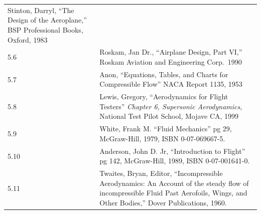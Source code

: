 \documentclass[
]{book}
\begin{document}
\begin{longtable}[]{@{}ll@{}}
\begin{minipage}[t]{0.88\columnwidth}
Stinton, Darryl, ``The Design of the Aeroplane,'' BSP Professional Books, Oxford, 1983\strut
\end{minipage}\tabularnewline
\begin{minipage}[t]{0.06\columnwidth}\raggedright
5.6\strut
\end{minipage} & \begin{minipage}[t]{0.88\columnwidth}\raggedright
Roskam, Jan Dr., ``Airplane Design, Part VI,'' Roskam Aviation and Engineering Corp.~1990\strut
\end{minipage}\tabularnewline
\begin{minipage}[t]{0.06\columnwidth}\raggedright
5.7\strut
\end{minipage} & \begin{minipage}[t]{0.88\columnwidth}\raggedright
Anon, ``Equations, Tables, and Charts for Compressible Flow'' NACA Report 1135, 1953\strut
\end{minipage}\tabularnewline
\begin{minipage}[t]{0.06\columnwidth}\raggedright
5.8\strut
\end{minipage} & \begin{minipage}[t]{0.88\columnwidth}\raggedright
Lewis, Gregory, ``Aerodynamics for Flight Testers'' \emph{Chapter 6, Supersonic Aerodynamics}, National Test Pilot School, Mojave CA, 1999\strut
\end{minipage}\tabularnewline
\begin{minipage}[t]{0.06\columnwidth}\raggedright
5.9\strut
\end{minipage} & \begin{minipage}[t]{0.88\columnwidth}\raggedright
White, Frank M. ``Fluid Mechanics'' pg 29, McGraw-Hill, 1979, ISBN 0-07-069667-5.\strut
\end{minipage}\tabularnewline
\begin{minipage}[t]{0.06\columnwidth}\raggedright
5.10\strut
\end{minipage} & \begin{minipage}[t]{0.88\columnwidth}\raggedright
Anderson, John D. Jr, ``Introduction to Flight'' pg 142, McGraw-Hill, 1989, ISBN 0-07-001641-0.\strut
\end{minipage}\tabularnewline
\begin{minipage}[t]{0.06\columnwidth}\raggedright
5.11\strut
\end{minipage} & \begin{minipage}[t]{0.88\columnwidth}\raggedright
Twaites, Bryan, Editor, ``Incompressible Aerodynamics: An Account of the steady flow of incompressible Fluid Past Aerofoils, Wings, and Other Bodies,'' Dover Publications, 1960.\strut
\end{minipage}\tabularnewline
\bottomrule
\end{longtable}
\end{document}
